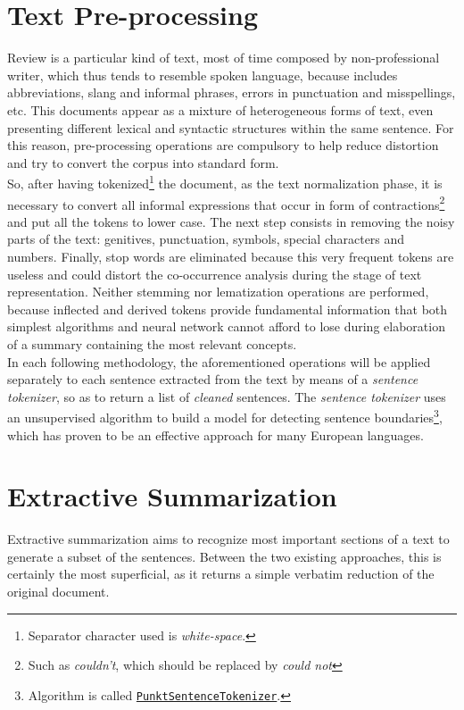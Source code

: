 \documentclass[fleqn,10pt]{SelfArx} %
\begin{document}
\section{Text Pre-processing}
Review is a particular kind of text, most of time composed by non-professional writer, which thus tends to resemble spoken language, because includes abbreviations, slang and informal phrases, errors in punctuation and misspellings, etc. This documents appear as a mixture of heterogeneous forms of text, even presenting different lexical and syntactic structures within the same sentence. For this reason, pre-processing operations are compulsory to help reduce distortion and try to convert the corpus into standard form.\\
So, after having tokenized\footnote{Separator character used is \textit{white-space}.} the document, as the text normalization phase, it is necessary to convert all informal expressions that occur in form of contractions\footnote{Such as \textit{couldn't}, which should be replaced by \textit{could not}} and put all the tokens to lower case. The next step consists in removing the noisy parts of the text: genitives, punctuation, symbols, special characters and numbers. Finally, stop words are eliminated because this very frequent tokens are useless and could distort the co-occurrence analysis during the stage of text representation. Neither stemming nor lematization operations are performed, because inflected and derived tokens provide fundamental information that both simplest algorithms and neural network cannot afford to lose during elaboration of a summary containing the most relevant concepts.\\
In each following methodology, the aforementioned operations will be applied separately to each sentence extracted from the text by means of a \textit{sentence tokenizer}, so as to return a list of \textit{cleaned} sentences. The \textit{sentence tokenizer} uses an unsupervised algorithm to build a model for detecting sentence boundaries\footnote{Algorithm is called \href{https://www.nltk.org/_modules/nltk/tokenize/punkt.html}{\texttt{PunktSentenceTokenizer}}.}, which has proven to be an effective approach for many European languages.
\section{Extractive Summarization}
Extractive summarization aims to recognize most important sections of a text to generate a subset of the sentences. Between the two existing approaches, this is certainly the most superficial, as it returns a simple verbatim reduction of the original document.
\end{document}
